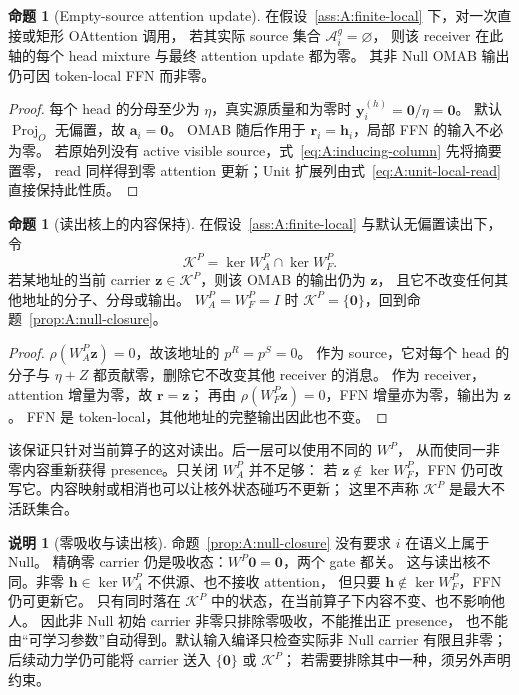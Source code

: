 \documentclass[11pt,UTF8,fontset=fandol]{ctexart}
\numberwithin{equation}{section}
\theoremstyle{definition}
\newtheorem{proposition}[definition]{命题}
\newtheorem{remark}[definition]{说明}
\begin{document}
\begin{proposition}[Empty-source attention update]
\label{prop:A:empty}
在假设~\ref{ass:A:finite-local} 下，对一次直接或矩形 OAttention 调用，
若其实际 source 集合 $\mathcal A_i^g=\varnothing$，
则该 receiver 在此轴的每个 head mixture 与最终 attention update 都为零。
其非 Null OMAB 输出仍可因 token-local FFN 而非零。
\end{proposition}
\begin{proof}
每个 head 的分母至少为 $\eta$，真实源质量和为零时 $\bm y_i^{(h)}=\bm0/\eta=\bm0$。
默认 $\operatorname{Proj}_O$ 无偏置，故 $\bm a_i=\bm0$。
OMAB 随后作用于 $\bm r_i=\bm h_i$，局部 FFN 的输入不必为零。
若原始列没有 active visible source，式~\eqref{eq:A:inducing-column} 先将摘要置零，
read 同样得到零 attention 更新；Unit 扩展列由式~\eqref{eq:A:unit-local-read} 直接保持此性质。
\end{proof}

\begin{proposition}[读出核上的内容保持]
\label{prop:A:joint-kernel}
在假设~\ref{ass:A:finite-local} 与默认无偏置读出下，令
\begin{equation}
  \mathcal K^{P}=\ker W_A^{P}\cap\ker W_F^{P}.
  \label{eq:A:joint-kernel}
\end{equation}
若某地址的当前 carrier $\bm z\in\mathcal K^{P}$，则该 OMAB 的输出仍为 $\bm z$，
且它不改变任何其他地址的分子、分母或输出。
$W_A^{P}=W_F^{P}=I$ 时 $\mathcal K^{P}=\{\bm0\}$，回到命题~\ref{prop:A:null-closure}。
\end{proposition}
\begin{proof}
$\rho(W_A^{P}\bm z)=0$，故该地址的 $p^R=p^S=0$。
作为 source，它对每个 head 的分子与 $\eta+Z$ 都贡献零，删除它不改变其他 receiver 的消息。
作为 receiver，attention 增量为零，故 $\bm r=\bm z$；
再由 $\rho(W_F^{P}\bm z)=0$，FFN 增量亦为零，输出为 $\bm z$。
FFN 是 token-local，其他地址的完整输出因此也不变。
\end{proof}
该保证只针对当前算子的这对读出。后一层可以使用不同的 $W^{P}$，
从而使同一非零内容重新获得 presence。只关闭 $W_A^{P}$ 并不足够：
若 $\bm z\notin\ker W_F^{P}$，FFN 仍可改写它。内容映射或相消也可以让核外状态碰巧不更新；
这里不声称 $\mathcal K^{P}$ 是最大不活跃集合。

\begin{remark}[零吸收与读出核]
命题~\ref{prop:A:null-closure} 没有要求 $i$ 在语义上属于 Null。
精确零 carrier 仍是吸收态：$W^{P}\bm0=\bm0$，两个 gate 都关。
这与读出核不同。非零 $\bm h\in\ker W_A^{P}$ 不供源、也不接收 attention，
但只要 $\bm h\notin\ker W_F^{P}$，FFN 仍可更新它。
只有同时落在 $\mathcal K^{P}$ 中的状态，在当前算子下内容不变、也不影响他人。
因此非 Null 初始 carrier 非零只排除零吸收，不能推出正 presence，
也不能由“可学习参数”自动得到。默认输入编译只检查实际非 Null carrier 有限且非零；
后续动力学仍可能将 carrier 送入 $\{\bm0\}$ 或 $\mathcal K^{P}$；
若需要排除其中一种，须另外声明约束。
\end{remark}
\end{document}
